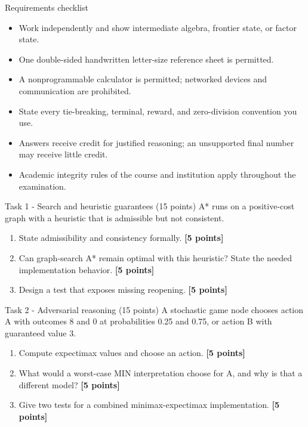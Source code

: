 \documentclass[aspectratio=169,11pt]{beamer}
\begin{document}
\begin{frame}{Requirements checklist}
\small
\begin{itemize}
  \item Work independently and show intermediate algebra, frontier state, or factor state.
  \item One double-sided handwritten letter-size reference sheet is permitted.
  \item A nonprogrammable calculator is permitted; networked devices and communication are prohibited.
  \item State every tie-breaking, terminal, reward, and zero-division convention you use.
  \item Answers receive credit for justified reasoning; an unsupported final number may receive little credit.
  \item Academic integrity rules of the course and institution apply throughout the examination.
\end{itemize}
\end{frame}

\begin{frame}{Task 1 - Search and heuristic guarantees (15 points)}
\small
A* runs on a positive-cost graph with a heuristic that is admissible but not consistent.

\vspace{0.2cm}
\begin{enumerate}
\item[\textbf{a.}] State admissibility and consistency formally. \hfill{\color{courseblue}\textbf{[5 points]}}
\item[\textbf{b.}] Can graph-search A* remain optimal with this heuristic? State the needed implementation behavior. \hfill{\color{courseblue}\textbf{[5 points]}}
\item[\textbf{c.}] Design a test that exposes missing reopening. \hfill{\color{courseblue}\textbf{[5 points]}}
\end{enumerate}
\end{frame}

\begin{frame}{Task 2 - Adversarial reasoning (15 points)}
\small
A stochastic game node chooses action A with outcomes 8 and 0 at probabilities 0.25 and 0.75, or action B with guaranteed value 3.

\vspace{0.2cm}
\begin{enumerate}
\item[\textbf{a.}] Compute expectimax values and choose an action. \hfill{\color{courseblue}\textbf{[5 points]}}
\item[\textbf{b.}] What would a worst-case MIN interpretation choose for A, and why is that a different model? \hfill{\color{courseblue}\textbf{[5 points]}}
\item[\textbf{c.}] Give two tests for a combined minimax-expectimax implementation. \hfill{\color{courseblue}\textbf{[5 points]}}
\end{enumerate}
\end{frame}
\end{document}
